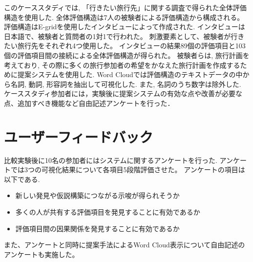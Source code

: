 \documentclass[syuuron]{kuee}
\begin{document}
		このケーススタディでは, 「行きたい旅行先」に関する調査で得られた全体評価構造を使用した. 
		全体評価構造は7人の被験者による評価構造から構成される。
		評価構造はE-gridを使用したインタビューによって作成された. 
		インタビューは日本語で、被験者と質問者の1対1で行われた。
		刺激要素として、被験者が行きたい旅行先をそれぞれ4つ使用した。
		インタビューの結果89個の評価項目と103個の評価項目間の接続による全体評価構造が得られた。
		被験者らは, 旅行計画を考えており, その際に多くの旅行参加者の希望をかなえた旅行計画を作成するために提案システムを使用した. 
		Word Cloudでは評価構造のテキストデータの中から名詞, 動詞, 形容詞を抽出して可視化した. 
		また, 名詞のうち数字は除外した. 
		ケーススタディ参加者には，実験後に提案システムの有効な点や改善が必要な点、追加すべき機能など自由記述アンケートを行った．
		
	\section{ユーザーフィードバック}
		比較実験後に10名の参加者にはシステムに関するアンケートを行った. 
		アンケートでは3つの可視化結果について各項目5段階評価させた。
		アンケートの項目は以下である. 
		
		\begin{itemize}
			\item 新しい発見や仮説構築につながる示唆が得られそうか
			\item 多くの人が共有する評価項目を発見することに有効であるか
			\item 評価項目間の因果関係を発見することに有効であるか
		\end{itemize}
		また、アンケートと同時に提案手法によるWord Cloud表示について自由記述のアンケートも実施した。
		
\end{document}
